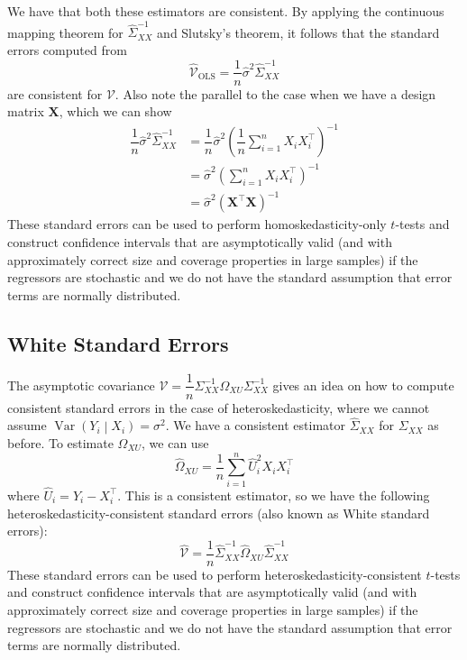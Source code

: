 \documentclass[11pt]{report} %
\begin{document}
We have that both these estimators are consistent. By applying the continuous mapping theorem for $\widehat{\Sigma}_{XX}^{-1}$ and Slutsky's theorem, it follows that the standard errors computed from
\begin{equation}
\widehat{\mathcal{V}}_{\mathrm{OLS}} = \dfrac{1}{n}\widehat{\sigma}^{2}\widehat{\Sigma}_{XX}^{-1}
\end{equation}
are consistent for $\mathcal{V}$. Also note the parallel to the case when we have a design matrix $\mathbf{X}$, which we can show
\begin{align}
\dfrac{1}{n}\widehat{\sigma}^{2}\widehat{\Sigma}_{XX}^{-1} &= \dfrac{1}{n}\widehat{\sigma}^{2}\left(\dfrac{1}{n}\sum_{i = 1}^{n}X_{i}X_{i}^{\top}\right)^{-1} \\
&= \widehat{\sigma}^{2}\left(\sum_{i = 1}^{n}X_{i}X_{i}^{\top}\right)^{-1} \\
&= \widehat{\sigma}^{2}\left(\mathbf{X}^{\top}\mathbf{X}\right)^{-1}
\end{align}
These standard errors can be used to perform homoskedasticity-only $t$-tests and construct confidence intervals that are asymptotically valid (and with approximately correct size and coverage properties in large samples) if the regressors are stochastic and we do not have the standard assumption that error terms are normally distributed.

\subsection{White Standard Errors}

The asymptotic covariance $\mathcal{V} = \dfrac{1}{n}\Sigma_{XX}^{-1}\Omega_{XU}\Sigma_{XX}^{-1}$ gives an idea on how to compute consistent standard errors in the case of heteroskedasticity, where we cannot assume $\operatorname{Var}\left(Y_{i}\middle| X_{i}\right) = \sigma^{2}$. We have a consistent estimator $\widehat{\Sigma}_{XX}$ for $\Sigma_{XX}$ as before. To estimate $\Omega_{XU}$, we can use
\begin{equation}
\widehat{\Omega}_{XU} = \dfrac{1}{n}\sum_{i = 1}^{n}\widehat{U}_{i}^{2}X_{i}X_{i}^{\top}
\end{equation}
where $\widehat{U}_{i} = Y_{i} - X_{i}^{\top}$. This is a consistent estimator, so we have the following heteroskedasticity-consistent standard errors (also known as White standard errors):
\begin{equation}
\widehat{\mathcal{V}} = \dfrac{1}{n}\widehat{\Sigma}_{XX}^{-1}\widehat{\Omega}_{XU}\widehat{\Sigma}_{XX}^{-1}
\end{equation}
These standard errors can be used to perform heteroskedasticity-consistent $t$-tests and construct confidence intervals that are asymptotically valid (and with approximately correct size and coverage properties in large samples) if the regressors are stochastic and we do not have the standard assumption that error terms are normally distributed.
\end{document}
